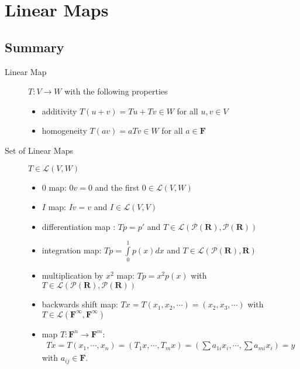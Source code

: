 %



\section{Linear Maps}
\subsection*{Summary}

\begin{description}
  \item[Linear Map] $T:V\to W$ with the following properties
  \begin{itemize}
  \item additivity $T(u+v) = Tu +Tv \in W$ for all $u,v\in V$
  \item homogeneity $T(av) = aTv \in W$ for all $a\in \mathbf{F}$
  \end{itemize}
  \item[Set of Linear Maps\label{itm:D3_set_linear_maps}] $T\in \mathcal{L}(V,W)$
  \begin{itemize}
  \item $0$ map: $0v = 0$ and the first $0\in \mathcal{L}(V,W)$
  \item $I$ map: $Iv=v$ and $I\in \mathcal{L}(V,V)$
  \item differentiation map : $Tp = p'$ and $T\in \mathcal{L}(\mathcal{P}(\mathbf{R}),\mathcal{P}(\mathbf{R}))$
  \item integration map: $Tp = \int\limits_0^1p(x)dx$ and $T\in \mathcal{L}(\mathcal{P}(\mathbf{R}),\mathbf{R})$
  \item multiplication by $x^2$ map: $Tp=x^2p(x)$ with $T\in \mathcal{L}(\mathcal{P}(\mathbf{R}),\mathcal{P}(\mathbf{R}))$
  \item backwards shift map: $T x = T(x_1,x_2, \cdots) = (x_2, x_3, \cdots)$ with $T\in \mathcal{L}(\mathbf{F}^\infty, \mathbf{F}^\infty)$
  \item map $T:\mathbf{F}^n \to \mathbf{F}^m$: 
  \begin{align*}
  T x = T(x_1,\cdots,x_n) =  (T_1x,  \cdots, T_m x) = (\sum a_{1i}x_i,  \cdots, \sum a_{mi}x_i) = y
  \end{align*} with $a_{ij}\in\mathbf{F}$.
  

\end{itemize}
\end{description}
